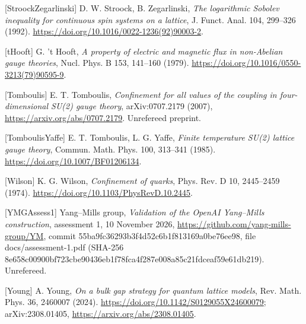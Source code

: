 \documentclass[10pt,letterpaper,twocolumn]{article}
\begin{document}
{[}StroockZegarlinski{]} D. W. Stroock, B. Zegarlinski, \emph{The logarithmic Sobolev inequality for continuous spin systems on a lattice}, J. Funct. Anal. 104, 299--326 (1992). \href{https://doi.org/10.1016/0022-1236(92)90003-2}{https:\allowbreak{}/\allowbreak{}/\allowbreak{}doi.\allowbreak{}org/\allowbreak{}10.\allowbreak{}1016/\allowbreak{}0022-\allowbreak{}1236(\allowbreak{}92)\allowbreak{}90003-\allowbreak{}2}.

{[}tHooft{]} G. 't Hooft, \emph{A property of electric and magnetic flux in non-Abelian gauge theories}, Nucl. Phys. B 153, 141--160 (1979). \href{https://doi.org/10.1016/0550-3213(79)90595-9}{https:\allowbreak{}/\allowbreak{}/\allowbreak{}doi.\allowbreak{}org/\allowbreak{}10.\allowbreak{}1016/\allowbreak{}0550-\allowbreak{}3213(\allowbreak{}79)\allowbreak{}90595-\allowbreak{}9}.

{[}Tomboulis{]} E. T. Tomboulis, \emph{Confinement for all values of the coupling in four-dimensional SU(2) gauge theory}, arXiv:0707.2179 (2007), \href{https://arxiv.org/abs/0707.2179}{https:\allowbreak{}/\allowbreak{}/\allowbreak{}arxiv.\allowbreak{}org/\allowbreak{}abs/\allowbreak{}0707.\allowbreak{}2179}. Unrefereed preprint.

{[}TomboulisYaffe{]} E. T. Tomboulis, L. G. Yaffe, \emph{Finite temperature SU(2) lattice gauge theory}, Commun. Math. Phys. 100, 313--341 (1985). \href{https://doi.org/10.1007/BF01206134}{https:\allowbreak{}/\allowbreak{}/\allowbreak{}doi.\allowbreak{}org/\allowbreak{}10.\allowbreak{}1007/\allowbreak{}BF012061\allowbreak{}34}.

{[}Wilson{]} K. G. Wilson, \emph{Confinement of quarks}, Phys. Rev. D 10, 2445--2459 (1974). \href{https://doi.org/10.1103/PhysRevD.10.2445}{https:\allowbreak{}/\allowbreak{}/\allowbreak{}doi.\allowbreak{}org/\allowbreak{}10.\allowbreak{}1103/\allowbreak{}PhysRevD\allowbreak{}.\allowbreak{}10.\allowbreak{}2445}.

{[}YMGAssess1{]} Yang--Mills group, \emph{Validation of the OpenAI Yang--Mills construction}, assessment 1, 10 November 2026, \href{https://github.com/yang-mills-group/YM}{https:\allowbreak{}/\allowbreak{}/\allowbreak{}github.\allowbreak{}com/\allowbreak{}yang-\allowbreak{}mills-\allowbreak{}group/\allowbreak{}YM}, commit 55ba9fc3\allowbreak{}6293b3f4\allowbreak{}d52c6b1f\allowbreak{}813169a0\allowbreak{}be76ee98\allowbreak{}, file docs/assessment-1.pdf (SHA-256 8e658c00\allowbreak{}900bf723\allowbreak{}cbe90436\allowbreak{}eb1f78fc\allowbreak{}a4f287e0\allowbreak{}08a85c21\allowbreak{}fdceaf59\allowbreak{}e61db219\allowbreak{})\allowbreak{}. Unrefereed.

{[}Young{]} A. Young, \emph{On a bulk gap strategy for quantum lattice models}, Rev. Math. Phys. 36, 2460007 (2024). \href{https://doi.org/10.1142/S0129055X24600079}{https:\allowbreak{}/\allowbreak{}/\allowbreak{}doi.\allowbreak{}org/\allowbreak{}10.\allowbreak{}1142/\allowbreak{}S0129055\allowbreak{}X2460007\allowbreak{}9}; arXiv:2308.01405, \href{https://arxiv.org/abs/2308.01405}{https:\allowbreak{}/\allowbreak{}/\allowbreak{}arxiv.\allowbreak{}org/\allowbreak{}abs/\allowbreak{}2308.\allowbreak{}01405}.
\end{document}
